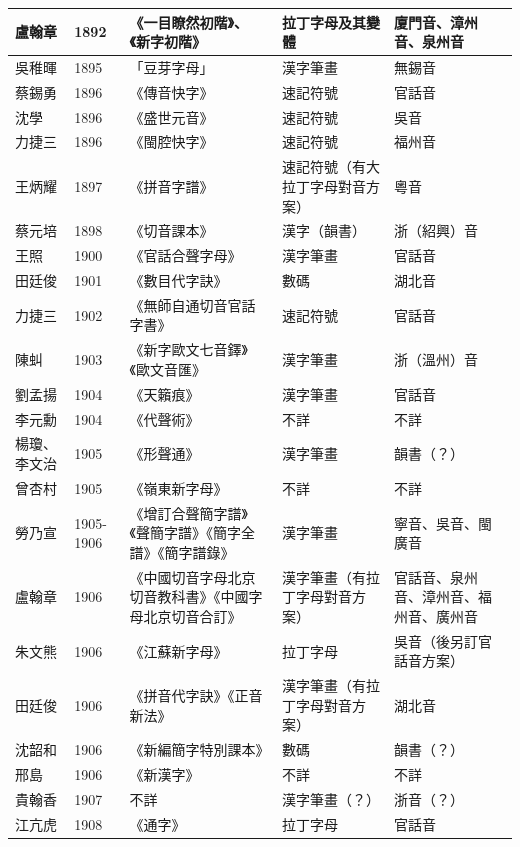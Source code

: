 \documentclass[a5paper, 12pt, openany]{book} %
\begin{document}
\begin{longtable}{|p{1.3cm}|p{1cm}|p{2.5cm}|p{2cm}|p{2cm}|}
  盧翰章 & 1892 & 《一目瞭然初階》、《新字初階》 & 拉丁字母及其變體 & 廈門音、漳州音、泉州音 \\ \hline
  吳稚暉 & 1895 & 「豆芽字母」 & 漢字筆畫 & 無錫音 \\ \hline
  蔡錫勇 & 1896 & 《傳音快字》 & 速記符號 & 官話音 \\ \hline
  沈學 & 1896 & 《盛世元音》 & 速記符號 & 吳音 \\ \hline
  力捷三 & 1896 & 《閩腔快字》 & 速記符號 & 福州音 \\ \hline
  王炳耀 & 1897 & 《拼音字譜》 & 速記符號（有大拉丁字母對音方案） & 粵音 \\ \hline
  蔡元培 & 1898 & 《切音課本》 & 漢字（韻書） & 浙（紹興）音 \\ \hline
  王照 & 1900 & 《官話合聲字母》 & 漢字筆畫 & 官話音 \\ \hline
  田廷俊 & 1901 & 《數目代字訣》 & 數碼 & 湖北音 \\ \hline
  力捷三 & 1902 & 《無師自通切音官話字書》 & 速記符號 & 官話音 \\ \hline
  陳虯 & 1903 & 《新字歐文七音鐸》《歐文音匯》 & 漢字筆畫 & 浙（溫州）音 \\ \hline
  劉孟揚 & 1904 & 《天籟痕》 & 漢字筆畫 & 官話音 \\ \hline
  李元勳 & 1904 & 《代聲術》 & 不詳 & 不詳 \\ \hline
  楊瓊、李文治 & 1905 & 《形聲通》 & 漢字筆畫 & 韻書（？） \\ \hline
  曾杏村 & 1905 & 《嶺東新字母》 & 不詳 & 不詳 \\ \hline
  勞乃宣 & 1905-1906 & 《增訂合聲簡字譜》《聲簡字譜》《簡字全譜》《簡字譜錄》 & 漢字筆畫 & 寧音、吳音、閩廣音 \\ \hline
  盧翰章 & 1906 & 《中國切音字母北京切音教科書》《中國字母北京切音合訂》 & 漢字筆畫（有拉丁字母對音方案） & 官話音、泉州音、漳州音、福州音、廣州音 \\ \hline
  朱文熊 & 1906 & 《江蘇新字母》 & 拉丁字母 & 吳音（後另訂官話音方案） \\ \hline
  田廷俊 & 1906 & 《拼音代字訣》《正音新法》 & 漢字筆畫（有拉丁字母對音方案） & 湖北音 \\ \hline
  沈韶和 & 1906 & 《新編簡字特別課本》 & 數碼 & 韻書（？） \\ \hline
  邢島 & 1906 & 《新漢字》 & 不詳 & 不詳 \\ \hline
  貴翰香 & 1907 & 不詳 & 漢字筆畫（？） & 浙音（？） \\ \hline
  江亢虎 & 1908 & 《通字》 & 拉丁字母 & 官話音 \\ \hline

\end{longtable}
\end{document}

